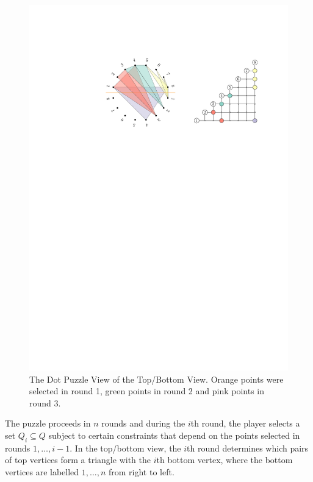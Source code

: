 \documentclass{patmorin}
\begin{document}
\begin{figure}
   \begin{center}
      \includegraphics{figs/point-view}
   \end{center}
   \caption{The Dot Puzzle View of the Top/Bottom View. Orange points were
     selected in round 1, green points in round 2 and pink points in round 3.}
\end{figure}

The puzzle proceeds in $n$ rounds and during the $i$th round, the player
selects a set $Q_i\subseteq Q$ subject to certain constraints that depend
on the points selected in rounds $1,\ldots,i-1$.  In the top/bottom view,
the $i$th round determines which pairs of top vertices form a triangle
with the $i$th bottom vertex, where the bottom vertices are labelled
$1,\ldots,n$ from right to left.
\end{document}
